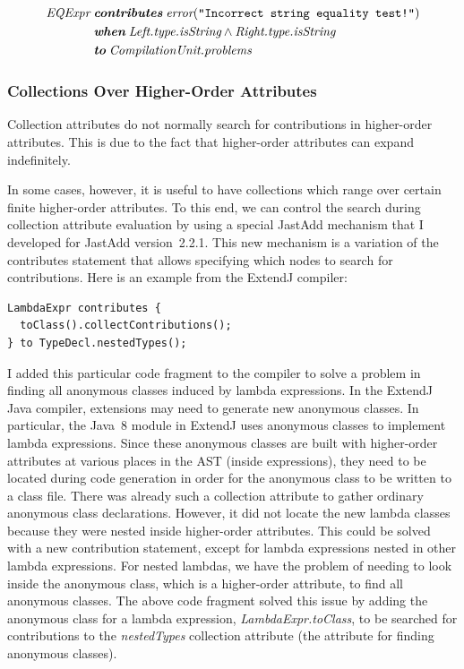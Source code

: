 \documentclass[10pt, twoside, openright]{book}
\begin{document}

\begin{align*}
\textit{EQExpr} \; & \textit{\textbf{contributes}} \; \textit{error}(\texttt{"Incorrect string equality test!"}) \\
  & \textit{\textbf{when}} \; \textit{Left.type.isString} \land \textit{Right.type.isString} \\
  & \textit{\textbf{to}} \; \textit{CompilationUnit.problems}
\end{align*}

\subsubsection{Collections Over Higher-Order Attributes}

Collection attributes do not normally search for contributions in higher-order
attributes.  This is due to the fact that higher-order attributes can expand
indefinitely.

In some cases, however, it is useful to have collections which range over
certain finite higher-order attributes. To this end, we can control the search
during collection attribute evaluation by using a special JastAdd mechanism
that I developed for JastAdd version~2.2.1. This new mechanism is a variation of
the contributes statement that allows specifying which nodes to search for contributions.
Here is an example from the ExtendJ compiler:

\begin{lstlisting}
LambdaExpr contributes {
  toClass().collectContributions();
} to TypeDecl.nestedTypes();
\end{lstlisting}


\noindent
I added this particular code fragment to the compiler to solve a problem in finding
all anonymous classes induced by lambda expressions.
In the ExtendJ Java compiler, extensions may need to generate new anonymous classes.
In particular, the Java~8 module in ExtendJ uses anonymous classes to implement lambda
expressions.  Since these anonymous classes are built with higher-order attributes
at various places in the AST (inside
expressions), they need to be located during code generation in order for the
anonymous class to be written to a class file.
There was already such a collection attribute to gather ordinary anonymous class
declarations. However, it did not locate the new lambda classes because they were
nested inside higher-order attributes. This could be solved with a new contribution statement,
except for lambda expressions nested in other lambda expressions.
For nested lambdas, we have the problem
of needing to look inside the anonymous class, which is a higher-order attribute,
to find all anonymous classes. The above code fragment solved this issue by adding the anonymous
class for a lambda expression, \emph{LambdaExpr.toClass},
to be searched for contributions to the \emph{nestedTypes} collection attribute
(the attribute for finding anonymous classes).
\end{document}
